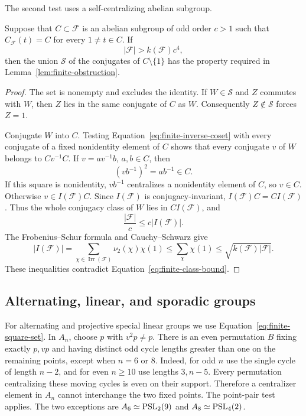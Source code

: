 The second test uses a self-centralizing abelian subgroup.
\begin{lemma}\label{lem:finite-abelian-test}
Suppose that $C\subset\mathcal F$ is an abelian subgroup of odd order
$c>1$ such that $C_{\mathcal F}(t)=C$ for every $1\ne t\in C$. If
\begin{equation}\label{eq:finite-class-bound}
 |\mathcal F|>k(\mathcal F)c^4,
\end{equation}
then the union $\mathcal S$ of the conjugates of $C\setminus\{1\}$
has the property required in Lemma~\ref{lem:finite-obstruction}.
\end{lemma}
\begin{proof}
The set is nonempty and excludes the identity. If $W\in\mathcal S$ and
$Z$ commutes with $W$, then $Z$ lies in the same conjugate of $C$ as $W$.
Consequently $Z\notin\mathcal S$ forces $Z=1$.

Conjugate $W$ into $C$. Testing Equation~\eqref{eq:finite-inverse-coset}
with every conjugate of a fixed nonidentity element of $C$ shows that
every conjugate $v$ of $W$ belongs to $Cv^{-1}C$. If
$v=a v^{-1}b$, $a,b\in C$, then
\[
 (v b^{-1})^2=a b^{-1}\in C.
\]
If this square is nonidentity, $v b^{-1}$ centralizes a nonidentity
element of $C$, so $v\in C$. Otherwise $v\in I(\mathcal F)C$.
Since $I(\mathcal F)$ is conjugacy-invariant, $I(\mathcal F)C=CI(\mathcal F)$.
Thus the whole conjugacy class of $W$ lies in $CI(\mathcal F)$, and
\[
 \frac{|\mathcal F|}{c}\le c|I(\mathcal F)|.
\]
The Frobenius--Schur formula and Cauchy--Schwarz give
\[
 |I(\mathcal F)|
 =\sum_{\chi\in\operatorname{Irr}(\mathcal F)}\nu_2(\chi)\chi(1)
 \le\sum_\chi\chi(1)
 \le\sqrt{k(\mathcal F)|\mathcal F|}.
\]
These inequalities contradict Equation~\eqref{eq:finite-class-bound}.
\end{proof}

\subsection{Alternating, linear, and sporadic groups}

For alternating and projective special linear groups we use
Equation~\eqref{eq:finite-square-set}. In $A_n$, choose $p$ with
$v^2p\ne p$. There is an even permutation $B$ fixing exactly $p,vp$
and having distinct odd cycle lengths greater than one on the remaining
points, except when $n=6$ or $8$. Indeed, for odd $n$ use the single
cycle of length $n-2$, and for even $n\ge10$ use lengths $3,n-5$.
Every permutation centralizing these moving cycles is even on their
support. Therefore a centralizer element in $A_n$ cannot interchange the
two fixed points. The point-pair test applies. The two exceptions are
$A_6\simeq\operatorname{PSL}_2(9)$ and $A_8\simeq\operatorname{PSL}_4(2)$.

